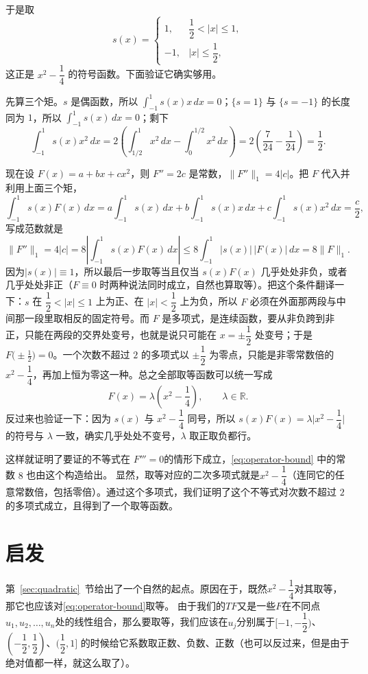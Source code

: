 \documentclass[UTF8,fontset=windows,a4paper,11pt]{ctexart}
\newcommand{\Lone}[1]{\lVert #1\rVert_1}
\begin{document}
于是取
\[
    s(x)=
    \begin{cases}
        1, & \dfrac12<|x|\le 1,\\[2pt]
        -1, & |x|\le\dfrac12,
    \end{cases}
\]
这正是 $x^2-\dfrac14$ 的符号函数。下面验证它确实够用。

先算三个矩。$s$ 是偶函数，所以 $\displaystyle\int_{-1}^{1}s(x)x\,dx=0$；$\{s=1\}$ 与 $\{s=-1\}$ 的长度同为 $1$，所以 $\displaystyle\int_{-1}^{1}s(x)\,dx=0$；剩下
\[
    \int_{-1}^{1}s(x)x^2\,dx
    =2\left(\int_{1/2}^{1}x^2\,dx-\int_{0}^{1/2}x^2\,dx\right)
    =2\left(\frac{7}{24}-\frac{1}{24}\right)
    =\frac12.
\]

现在设 $F(x)=a+bx+cx^2$，则 $F''=2c$ 是常数，$\Lone{F''}=4|c|$。把 $F$ 代入并利用上面三个矩，
\[
    \int_{-1}^{1}s(x)F(x)\,dx
    =a\int_{-1}^{1}s(x)\,dx+b\int_{-1}^{1}s(x)x\,dx+c\int_{-1}^{1}s(x)x^2\,dx
    =\frac{c}{2},
\]
写成范数就是
\[
    \Lone{F''}
    =4|c|
    =8\left|\int_{-1}^{1}s(x)F(x)\,dx\right|
    \le 8\int_{-1}^{1}|s(x)|\,|F(x)|\,dx
    =8\Lone{F}.
\]
因为$|s(x)|\equiv1$，所以最后一步取等当且仅当 $s(x)F(x)$ 几乎处处非负，或者几乎处处非正（$F\equiv0$ 时两种说法同时成立，自然也算取等）。把这个条件翻译一下：$s$ 在 $\dfrac12<|x|\le1$ 上为正、在 $|x|<\dfrac12$ 上为负，所以 $F$ 必须在外面那两段与中间那一段里取相反的固定符号。而 $F$ 是多项式，是连续函数，要从非负跨到非正，只能在两段的交界处变号，也就是说只可能在 $x=\pm\dfrac12$ 处变号；于是 $F\bigl(\pm\frac12\bigr)=0$。一个次数不超过 $2$ 的多项式以 $\pm\dfrac12$ 为零点，只能是非零常数倍的 $x^2-\dfrac14$，再加上恒为零这一种。总之全部取等函数可以统一写成
\[
    F(x)=\lambda\left(x^2-\frac14\right),\qquad \lambda\in\mathbb{R}.
\]
反过来也验证一下：因为 $s(x)$ 与 $x^2-\dfrac14$ 同号，所以 $s(x)F(x)=\lambda\bigl|x^2-\dfrac14\bigr|$ 的符号与 $\lambda$ 一致，确实几乎处处不变号，$\lambda$ 取正取负都行。

这样就证明了要证的不等式在 $F'''=0$的情形下成立，\eqref{eq:operator-bound} 中的常数 $8$ 也由这个构造给出。
显然，取等对应的二次多项式就是$x^2-\dfrac{1}{4}$（连同它的任意常数倍，包括零倍）。通过这个多项式，我们证明了这个不等式对次数不超过 $2$ 的多项式成立，且得到了一个取等函数。
\section{启发}

第~\ref{sec:quadratic}~节给出了一个自然的起点。原因在于，既然$x^2-\dfrac{1}{4}$对其取等，那它也应该对\eqref{eq:operator-bound}取等。
由于我们的$TF$又是一些$F$在不同点$u_1,u_2,\dots,u_n$处的线性组合，那么要取等，我们应该在$u_j$分别属于$[-1,-\dfrac{1}{2})$、$(-\dfrac{1}{2},\dfrac{1}{2})$、$(\dfrac{1}{2},1]$
的时候给它系数取正数、负数、正数（也可以反过来，但是由于绝对值都一样，就这么取了）。
\end{document}
